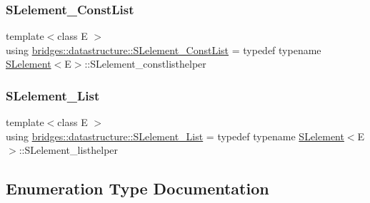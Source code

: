 \mbox{\label{namespacebridges_1_1datastructure_adc1ea9eeab8d889046a192dc16743190}} 
\subsubsection{\texorpdfstring{S\+Lelement\+\_\+\+Const\+List}{SLelement\_ConstList}}
{\footnotesize\ttfamily template$<$class E $>$ \\
using \hyperlink{namespacebridges_1_1datastructure_adc1ea9eeab8d889046a192dc16743190}{bridges\+::datastructure\+::\+S\+Lelement\+\_\+\+Const\+List} = typedef typename \hyperlink{classbridges_1_1datastructure_1_1_s_lelement}{S\+Lelement}$<$E$>$\+::S\+Lelement\+\_\+constlisthelper}

\mbox{\label{namespacebridges_1_1datastructure_a0db8f181ce44ed3dd8b3da7184c2364a}} 
\subsubsection{\texorpdfstring{S\+Lelement\+\_\+\+List}{SLelement\_List}}
{\footnotesize\ttfamily template$<$class E $>$ \\
using \hyperlink{namespacebridges_1_1datastructure_a0db8f181ce44ed3dd8b3da7184c2364a}{bridges\+::datastructure\+::\+S\+Lelement\+\_\+\+List} = typedef typename \hyperlink{classbridges_1_1datastructure_1_1_s_lelement}{S\+Lelement}$<$E$>$\+::S\+Lelement\+\_\+listhelper}



\subsection{Enumeration Type Documentation}
\mbox{\label{namespacebridges_1_1datastructure_a3408f5f44d9c6062e5f3adb7e1bbb7f0}} 
